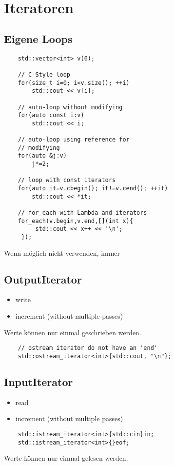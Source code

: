 \section{Iteratoren}
\subsection{Eigene Loops}
\begin{lstlisting}
	std::vector<int> v(6);
	
	// C-Style loop
	for(size_t i=0; i<v.size(); ++i)
		std::cout << v[i];
	
	// auto-loop without modifying
	for(auto const i:v)
		std::cout << i;
	
	// auto-loop using reference for 
	// modifying
	for(auto &j:v)
		j*=2;

	// loop with const iterators
	for(auto it=v.cbegin(); it!=v.cend(); ++it)
		std::cout << *it;
		
	// for_each with Lambda and iterators
	for_each(v.begin,v.end,[](int x){
		 std::cout << x++ << '\n';
	 });
\end{lstlisting}
Wenn möglich nicht verwenden, immer 


\subsection{OutputIterator}
\begin{itemize}
	\item write
	\item increment (without multiple passes)
\end{itemize}
Werte können nur einmal geschrieben werden.
\begin{lstlisting}
	// ostream_iterator do not have an 'end'
	std::ostream_iterator<int>{std::cout, "\n"};
\end{lstlisting}

\subsection{InputIterator}
\begin{itemize}
	\item read
	\item increment (without multiple passes) 
\end{itemize}
\begin{lstlisting}
	std::istream_iterator<int>{std::cin}in;
	std::istream_iterator<int>{}eof;
\end{lstlisting}
Werte können nur einmal gelesen werden.

